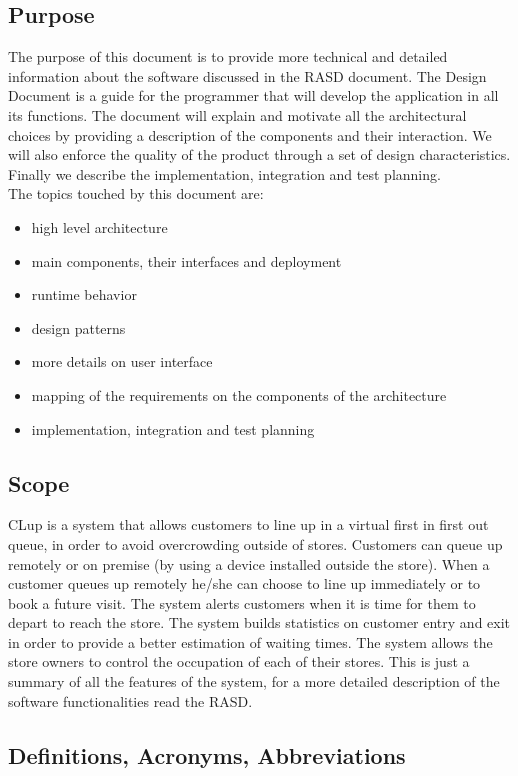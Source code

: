 \subsection{Purpose}
The purpose of this document is to provide more technical and detailed information about the software discussed in the RASD document. The Design Document is a guide for the programmer that will develop the application in all its functions. The document will explain and motivate all the architectural choices by providing a description of the components and their interaction. We will also enforce the quality of the product through a set of design characteristics. Finally we describe the implementation, integration and test planning.\\
The topics touched by this document are:
\begin{itemize}
	\item high level architecture
	\item main components, their interfaces and deployment
	\item runtime behavior
	\item design patterns
	\item more details on user interface
	\item mapping of the requirements on the components of the architecture
	\item implementation, integration and test planning
\end{itemize}

\subsection{Scope}

CLup is a system that allows customers to line up in a virtual first in first out queue, in order to avoid overcrowding outside of stores. Customers can queue up remotely or on premise (by using a device installed outside the store). When a customer queues up remotely he/she can choose to line up immediately or to book a future visit. The system alerts customers when it is time for them to depart to reach the store. The system builds statistics on customer entry and exit in order to provide a better estimation of waiting times. The system allows the store owners to control the occupation of each of their stores. This is just a summary of all the features of the system, for a more detailed description of the software functionalities read the RASD. 

\subsection{Definitions, Acronyms, Abbreviations}
